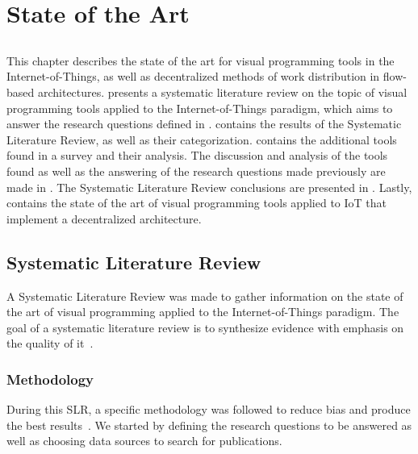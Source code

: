 \chapter{State of the Art} \label{chap:sota}

\section*{}

\minitoc \mtcskip \noindent
This chapter describes the state of the art for visual programming tools in the Internet-of-Things, as well as decentralized methods of work distribution in flow-based architectures.  presents a systematic literature review on the topic of visual programming tools applied to the Internet-of-Things paradigm, which aims to answer the research questions defined in .  contains the results of the Systematic Literature Review, as well as their categorization.  contains the additional tools found in a survey and their analysis. The discussion and analysis of the tools found as well as the answering of the research questions made previously are made in . The Systematic Literature Review conclusions are presented in . Lastly,  contains the state of the art of visual programming tools applied to IoT that implement a decentralized architecture.

\section{Systematic Literature Review}\label{sec:slr}

A Systematic Literature Review was made to gather information on the state of the art of visual programming applied to the Internet-of-Things paradigm. The goal of a systematic literature review is to synthesize evidence with emphasis on the quality of it~\cite{SLR_guidelines}.

\subsection{Methodology}\label{sec:methodology}

During this SLR, a specific methodology was followed to reduce bias and produce the best results~\cite{SLR_guidelines}. We started by defining the research questions to be answered as well as choosing data sources to search for publications.

